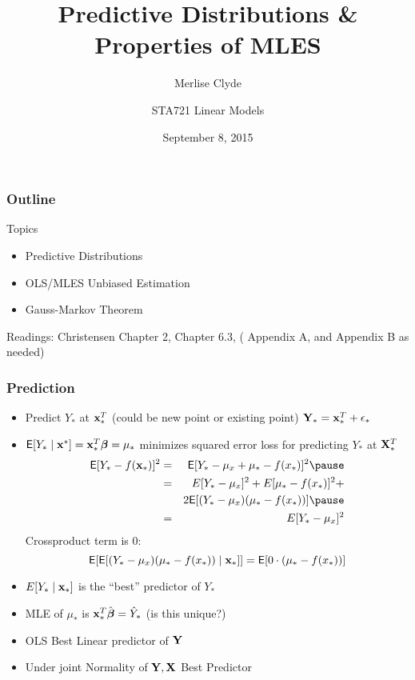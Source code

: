 \documentclass[handout]{beamer}
\title{Predictive Distributions \& Properties of MLES}
\subtitle{Merlise Clyde}
\author{STA721 Linear Models}
\institute{Duke University}
\date{September 8, 2015}
\begin{document}
\maketitle

\begin{frame}\frametitle{Outline}
Topics
  \begin{itemize}
  \item Predictive Distributions
  \item OLS/MLES Unbiased Estimation
  \item Gauss-Markov Theorem
  \end{itemize}


Readings: Christensen Chapter 2,  Chapter 6.3, ( Appendix A, and
Appendix B as needed)
\end{frame}

\begin{frame} \frametitle{Prediction}

  \begin{itemize}
  \item Predict $Y_*$ at $\mathbf{x}_*^T$   (could be new point or existing
    point) $\mathbf{Y}_* = \mathbf{x}_*^T + \epsilon_*$ \pause
 \item $\textsf{E}[Y_* \mid \mathbf{x}^*] = \mathbf{x}_*^{T} \boldsymbol{\beta} = \mu_*$ minimizes squared
   error loss for predicting $Y_*$ at $\mathbf{X}_*^T$ \pause
   \begin{eqnarray*}
     \E[Y_* - f(\x_*)]^2 & = & \E[Y_* - \mu_x + \mu_* - f(x_*)]^2
                               \pause \\
 & = & E[Y_* - \mu_x]^2 + E[\mu_* - f(x_*)]^2 + \\  &  & 2\E[( Y_* -
       \mu_x)(\mu_* - f(x_*))] \pause \\
 & = & E[Y_* - \mu_x]^2   \end{eqnarray*} \pause
Crossproduct term is 0:  
$$\textsf{E}[\textsf{E}[( Y_* -
       \mu_x)(\mu_* - f(x_*))\mid \mathbf{x}_*]] = \textsf{E}[0 \cdot (\mu_* -
       f(x_*))]$$
\item $E[Y_* \mid \mathbf{x}_*]$ is the ``best'' predictor of $Y_*$
\item MLE of $\mu_*$ is $\mathbf{x}_*^{T} \hat{\boldsymbol{\beta}}  = \hat{Y}_*$ (is this
  unique?) \pause
\item OLS Best Linear predictor of $\mathbf{Y}$
\item Under joint Normality of $\mathbf{Y}, \mathbf{X}$  Best Predictor
  \end{itemize}
\end{frame}
\end{document}
